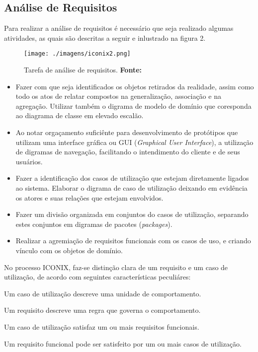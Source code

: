 \subsection{Análise de Requisitos}

\par Para realizar a análise de requisitos é necessário que seja realizado
algumas atividades, as quais são descritas a seguir e inlustrado na figura 2.

\begin{figure}[h!]
  \centerline{\texttt{[image: ./imagens/iconix2.png]}}
  \caption[Tarefa de análise de requisitos]
          {Tarefa de análise de requisitos. \textbf{Fonte:}
          \cite{UML_Silva_Videira}}
\label{fig:exemplo1}
\end{figure}

\begin{itemize}
  \item Fazer com que seja identificados os objetos retirados da realidade,
  assim como todo os atos de relatar compostos na generalização, associação e na
  agregação. Utilizar também o digrama de modelo de domínio que coresponda ao
  diagrama de classe em elevado escalão.
  \item Ao notar orgaçamento suficiênte para desenvolvimento de protótipos que
  utilizam uma interface gráfica ou GUI (\textit{Graphical User   Interface}), 
  a utilização de digramas de navegação, facilitando o intendimento
  do cliente e de seus usuários.
  \item Fazer a identificação dos casos de utilização que estejam diretamente
  ligados ao sistema. Elaborar o digrama de caso de utilização deixando em
  evidência os atores e suas relações que estejam envolvidos.
  \item Fazer um divisão organizada em conjuntos do casos de utilização,
  separando estes conjuntos em digramas de pacotes (\textit{packages}).
  \item Realizar a agremiação de requisitos funcionais com os casos de uso, e
  criando vínculo com os objetos de domínio.
\end{itemize}

\par No processo ICONIX, faz-se distinção clara de um requisito e um caso de
utilização, de acordo com  seguintes
características peculiáres:

\begin{citacao}
     \par Um caso de utilização descreve uma unidade de comportamento.
  	 \par Um requisito descreve uma regra que governa o comportamento.
  	 \par Um caso de utilização satisfaz um ou mais requisitos funcionais.
  	 \par Um requisito funcional pode ser satisfeito por um ou mais casos de
			utilização.
\end{citacao}

